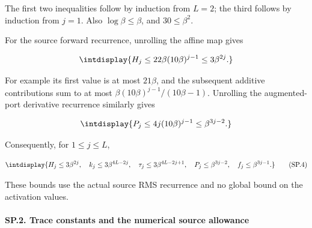 
The first two inequalities follow by induction from \(L=2\); the third follows by induction from \(j=1\). Also \(\log\beta\le\beta\), and \(30\le\beta^2\).



For the source forward recurrence, unrolling the affine map gives


\begingroup\renewcommand{\theHequation}{intdisplay.422}
\begin{equation*}
\intdisplay{
H_j\le22\beta(10\beta)^{j-1}\le3\beta^{2j}.
}
\end{equation*}
\endgroup


For example its first value is at most \(21\beta\), and the subsequent additive contributions sum to at most \(\beta(10\beta)^{j-1}/(10\beta-1)\). Unrolling the augmented-port derivative recurrence similarly gives


\begingroup\renewcommand{\theHequation}{intdisplay.423}
\begin{equation*}
\intdisplay{
P_j\le4j(10\beta)^{j-1}\le\beta^{3j-2}.
}
\end{equation*}
\endgroup


Consequently, for \(1\le j\le L\),


\begingroup\renewcommand{\theHequation}{intdisplay.424}
\begin{equation}
\intdisplay{
{H_j\le3\beta^{2j},\quad
k_j\le3\beta^{4L-2j},\quad
\tau_j\le3\beta^{4L-2j+1},\quad
P_j\le\beta^{3j-2},\quad f_j\le\beta^{3j-1}.}
}
\tag{SP.4}
\label{int:eq-0208-sp-4}
\end{equation}
\endgroup


These bounds use the actual source RMS recurrence and no global bound on the activation values.


\paragraph{SP.2. Trace constants and the numerical source allowance}

\mbox{}\par\smallskip


